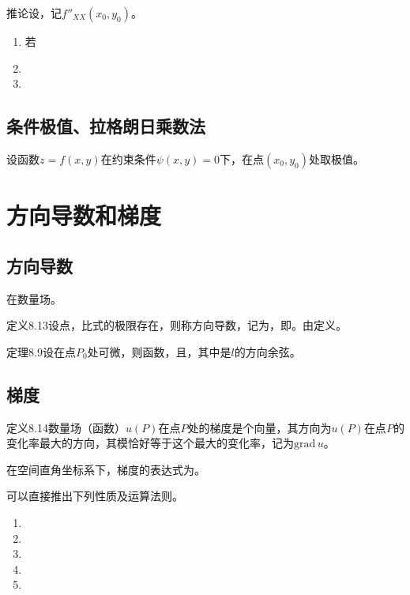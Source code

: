 \noindent 推论\quad 设，记$f''_{XX}(x_0,y_0)$。
\begin{enumerate}
    \item 若
    \item
    \item
\end{enumerate}

\subsection{条件极值、拉格朗日乘数法}

设函数$z=f(x,y)$在约束条件$\psi(x,y)=0$下，在点$(x_0,y_0)$处取极值。

\section{方向导数和梯度}
\subsection{方向导数}

在数量场。

定义8.13\quad 设点，比式的极限存在，则称方向导数，记为，即。由定义。

定理8.9\quad 设在点$P_0$处可微，则函数，且，其中是$l$的方向余弦。

\subsection{梯度}

定义8.14\quad 数量场（函数）$u(P)$在点$P$处的梯度是个向量，其方向为$u(P)$在点$P$的变化率最大的方向，其模恰好等于这个最大的变化率，记为$\mathrm{grad}\,u$。

在空间直角坐标系下，梯度的表达式为。

可以直接推出下列性质及运算法则。
\begin{enumerate}
    \item
    \item
    \item
    \item
    \item
\end{enumerate}